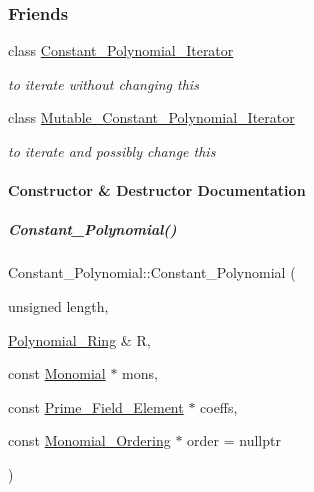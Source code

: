 \subsubsection*{Friends}
\begin{DoxyCompactItemize}
\item 
\mbox{\label{group__polygroup_ab740f854a3b6a761b4deaf1dc3fc4dbf}} 
class \hyperlink{group__polygroup_ab740f854a3b6a761b4deaf1dc3fc4dbf}{Constant\+\_\+\+Polynomial\+\_\+\+Iterator}
\begin{DoxyCompactList}\small\item\em to iterate without changing {\ttfamily this} \end{DoxyCompactList}\item 
\mbox{\label{group__polygroup_aefeb273b3b448966d0c8b5041a420d20}} 
class \hyperlink{group__polygroup_aefeb273b3b448966d0c8b5041a420d20}{Mutable\+\_\+\+Constant\+\_\+\+Polynomial\+\_\+\+Iterator}
\begin{DoxyCompactList}\small\item\em to iterate and possibly change {\ttfamily this} \end{DoxyCompactList}\end{DoxyCompactItemize}


\paragraph{Constructor \& Destructor Documentation}
\mbox{\label{group__polygroup_a17e78adc39df3472a0610b17c906898f}} 
\subparagraph{\texorpdfstring{Constant\+\_\+\+Polynomial()}{Constant\_Polynomial()}\hspace{0.1cm}{\footnotesize\ttfamily [1/4]}}
{\footnotesize\ttfamily Constant\+\_\+\+Polynomial\+::\+Constant\+\_\+\+Polynomial (\begin{DoxyParamCaption}\item[{unsigned}]{length,  }\item[{\hyperlink{group__polygroup_class_polynomial___ring}{Polynomial\+\_\+\+Ring} \&}]{R,  }\item[{const \hyperlink{group__polygroup_class_monomial}{Monomial} $\ast$}]{mons,  }\item[{const \hyperlink{group___fields_group_class_prime___field___element}{Prime\+\_\+\+Field\+\_\+\+Element} $\ast$}]{coeffs,  }\item[{const \hyperlink{group__orderinggroup_class_monomial___ordering}{Monomial\+\_\+\+Ordering} $\ast$}]{order = {\ttfamily nullptr} }\end{DoxyParamCaption})}


